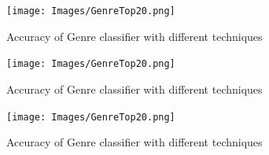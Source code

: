 \documentclass{sig-alternate-05-2015}
\begin{document}
\begin{figure}[h]
    \centering
    \texttt{[image: Images/GenreTop20.png]}
    \caption{Accuracy of Genre classifier with different techniques}
\end{figure}

\begin{figure}[h]
    \centering
    \texttt{[image: Images/GenreTop20.png]}
    \caption{Accuracy of Genre classifier with different techniques}
\end{figure}

\begin{figure}[h]
    \centering
    \texttt{[image: Images/GenreTop20.png]}
    \caption{Accuracy of Genre classifier with different techniques}
\end{figure}


\nocite{*}




\end{document}
